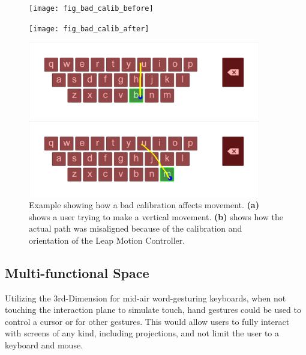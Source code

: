 \begin{figure}[h]
	\centering
	\begin{minipage}[t]{6in}
		\begin{minipage}[t]{1.5in}
			\begin{minipage}[t]{1.5in}
				\texttt{[image: fig\_bad\_calib\_before]}
			\end{minipage}
			
			\begin{minipage}[t]{1.5in}
				\texttt{[image: fig\_bad\_calib\_after]}
			\end{minipage}
		\end{minipage}
		\begin{minipage}[t]{4.5in}
			\begin{minipage}[t]{4.3in}
				\includegraphics[width=4in]{fig_intended_path}
			\end{minipage}
			
			\begin{minipage}[t]{4.3in}
				\includegraphics[width=4in]{fig_actual_path}
			\end{minipage}
		\end{minipage}
	\end{minipage}
	\caption[Bad Calibration Example]{Example showing how a bad calibration affects movement. \textbf{(a)} shows a user trying to make a vertical movement. \textbf{(b)} shows how the actual path was misaligned because of the calibration and orientation of the Leap Motion Controller.}
	\label{bad_calib_problem}
\end{figure}

\subsection{Multi-functional Space}
Utilizing the 3rd-Dimension for mid-air word-gesturing keyboards, when not touching the interaction plane to simulate touch, hand gestures could be used to control a cursor or for other gestures. This would allow users to fully interact with screens of any kind, including projections, and not limit the user to a keyboard and mouse.

